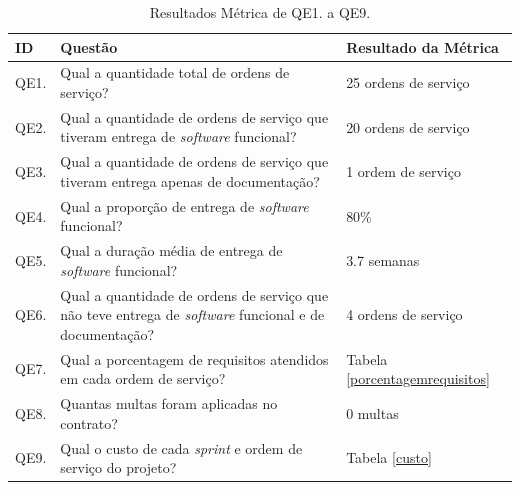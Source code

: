 \begin{table}[h]
\begin{tabular}{|p{2.0cm}|p{9.0cm}|p{5.0cm}|}
\hline
\textbf{ID} & \textbf{Questão}                                                                                                                                  & \textbf{Resultado da Métrica}    \\ \hline
QE1.        & Qual a quantidade total de ordens de serviço?                                                                                                    & 25 ordens de serviço          \\ \hline
QE2.        & Qual a quantidade de ordens de serviço que tiveram entrega de \textit{software} funcional?                                                                & 20 ordens de serviço          \\ \hline
QE3.        & Qual a quantidade de ordens de serviço que tiveram entrega apenas de documentação?                                                               & 1 ordem de serviço            \\ \hline
QE4.        & Qual a proporção de entrega de \textit{software} funcional?                                                                                               & 80\%                          \\ \hline
QE5.        & Qual a duração média de entrega de \textit{software} funcional?                                                                                           & 3.7 semanas                   \\ \hline
QE6.        & Qual a quantidade de ordens de serviço que não teve entrega de \textit{software} funcional e  de documentação?   & 4 ordens de serviço           \\ \hline
QE7.        & Qual a porcentagem de requisitos atendidos em cada ordem de serviço?                                                                             &  Tabela \ref{porcentagemrequisitos} \\ \hline
QE8.        & Quantas multas foram aplicadas no contrato?                                                                                                      & 0 multas                      \\ \hline
QE9.        & Qual o custo de cada \textit{sprint} e ordem de serviço do projeto?                                                                                       & Tabela \ref{custo}                 \\ \hline
\end{tabular}
\caption{Resultados Métrica de QE1. a QE9.}
		\label{resultadosmetricas}
\end{table}


